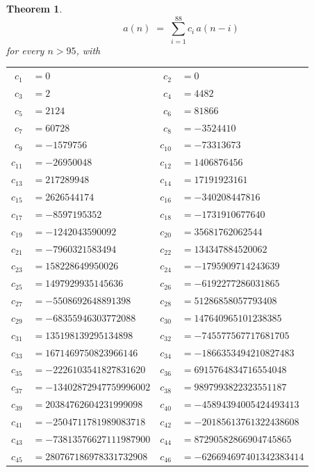 \documentclass[11pt,a4paper]{article}
\theoremstyle{plain}
\newtheorem{theorem}{Theorem}
\theoremstyle{definition}
\begin{document}
\begin{theorem}
\[
a(n)\;=\;\sum_{i=1}^{88}c_i\,a(n-i)
\]
for every $n>95$, with
\begin{center}\footnotesize
\begin{tabular}{r@{\,}l@{\qquad}r@{\,}l}
$c_{1}$ & $=0$ & $c_{2}$ & $=0$ \\
$c_{3}$ & $=2$ & $c_{4}$ & $=4482$ \\
$c_{5}$ & $=2124$ & $c_{6}$ & $=81866$ \\
$c_{7}$ & $=60728$ & $c_{8}$ & $=-3524410$ \\
$c_{9}$ & $=-1579756$ & $c_{10}$ & $=-73313673$ \\
$c_{11}$ & $=-26950048$ & $c_{12}$ & $=1406876456$ \\
$c_{13}$ & $=217289948$ & $c_{14}$ & $=17191923161$ \\
$c_{15}$ & $=2626544174$ & $c_{16}$ & $=-340208447816$ \\
$c_{17}$ & $=-8597195352$ & $c_{18}$ & $=-1731910677640$ \\
$c_{19}$ & $=-1242043590092$ & $c_{20}$ & $=35681762062544$ \\
$c_{21}$ & $=-7960321583494$ & $c_{22}$ & $=134347884520062$ \\
$c_{23}$ & $=158228649950026$ & $c_{24}$ & $=-1795909714243639$ \\
$c_{25}$ & $=1497929935145636$ & $c_{26}$ & $=-6192277286031865$ \\
$c_{27}$ & $=-5508692648891398$ & $c_{28}$ & $=51286858057793408$ \\
$c_{29}$ & $=-68355946303772088$ & $c_{30}$ & $=147640965101238385$ \\
$c_{31}$ & $=135198139295134898$ & $c_{32}$ & $=-745577567717681705$ \\
$c_{33}$ & $=1671469750823966146$ & $c_{34}$ & $=-1866353494210827483$ \\
$c_{35}$ & $=-2226103541827831620$ & $c_{36}$ & $=6915764834716554048$ \\
$c_{37}$ & $=-13402872947759996002$ & $c_{38}$ & $=9897993822323551187$ \\
$c_{39}$ & $=20384762604231999098$ & $c_{40}$ & $=-45894394005424493413$ \\
$c_{41}$ & $=-2504711781989083718$ & $c_{42}$ & $=-20185613761322438608$ \\
$c_{43}$ & $=-73813576627111987900$ & $c_{44}$ & $=87290582866904745865$ \\
$c_{45}$ & $=280767186978331732908$ & $c_{46}$ & $=-626694697401342383414$ \\

\end{tabular}
\end{center}
\end{theorem}
\end{document}
